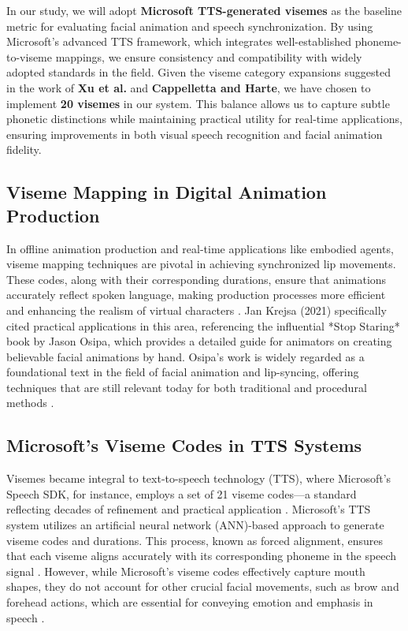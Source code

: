\documentclass[12pt]{article}
\begin{document}
In our study, we will adopt \textbf{Microsoft TTS-generated visemes} as the baseline metric for evaluating facial animation and speech synchronization. By using Microsoft’s advanced TTS framework, which integrates well-established phoneme-to-viseme mappings, we ensure consistency and compatibility with widely adopted standards in the field. Given the viseme category expansions suggested in the work of \textbf{Xu et al.} and \textbf{Cappelletta and Harte}, we have chosen to implement \textbf{20 visemes} in our system. This balance allows us to capture subtle phonetic distinctions while maintaining practical utility for real-time applications, ensuring improvements in both visual speech recognition and facial animation fidelity.
\subsection{Viseme Mapping in Digital Animation Production}
\label{sec:useinprod}
In offline animation production and real-time applications like embodied agents, viseme mapping techniques are pivotal in achieving synchronized lip movements. These codes, along with their corresponding durations, ensure that animations accurately reflect spoken language, making production processes more efficient and enhancing the realism of virtual characters \cite{Osipa2010StopRight}. Jan Krejsa (2021) specifically cited practical applications in this area, referencing the influential *Stop Staring* book by Jason Osipa, which provides a detailed guide for animators on creating believable facial animations by hand. Osipa's work is widely regarded as a foundational text in the field of facial animation and lip-syncing, offering techniques that are still relevant today for both traditional and procedural methods \cite{Krejsa2019, Krejsa2021}.

\subsection{Microsoft's Viseme Codes in TTS Systems}
\label{sec:mstts}
Visemes became integral to text-to-speech technology (TTS), where Microsoft’s Speech SDK, for instance, employs a set of 21 viseme codes—a standard reflecting decades of refinement and practical application \cite{GetLearn}. Microsoft's TTS system utilizes an artificial neural network (ANN)-based approach to generate viseme codes and durations. This process, known as forced alignment, ensures that each viseme aligns accurately with its corresponding phoneme in the speech signal \cite{Xu2013AGames}. However, while Microsoft’s viseme codes effectively capture mouth shapes, they do not account for other crucial facial movements, such as brow and forehead actions, which are essential for conveying emotion and emphasis in speech \cite{Massaro1998PerceivingPrinciple, Massaro2000ReviewPrinciple}.
\end{document}
